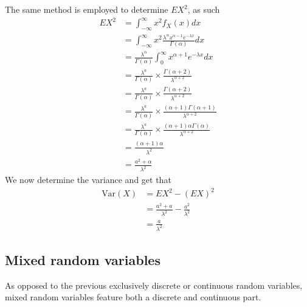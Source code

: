 The same method is employed to determine $EX^{2}$, as such
\begin{align*}
    EX^{2}&=\int_{-\infty}^{\infty}x^{2}f_{X}(x)dx \\
      &=\int_{-\infty}^{\infty}x^{2}\frac{\lambda^{\alpha}x^{\alpha-1}e^{-\lambda x}}{\Gamma(\alpha)}dx \\
      &=\frac{\lambda^{\alpha}}{\Gamma(\alpha)}\int_{0}^{\infty}x^{\alpha+1}e^{-\lambda x}dx \\
      &=\frac{\lambda^{a}}{\Gamma(\alpha)}\times\frac{\Gamma(\alpha+2)}{\lambda^{\alpha+2}} \\
      &=\frac{\lambda^{a}}{\Gamma(\alpha)}\times\frac{\Gamma(\alpha+2)}{\lambda^{\alpha+2}} \\
      &=\frac{\lambda^{a}}{\Gamma(\alpha)}\times\frac{(\alpha+1)\Gamma(\alpha+1)}{\lambda^{\alpha+2}} \\
      &=\frac{\lambda^{a}}{\Gamma(\alpha)}\times\frac{(\alpha+1)\alpha\Gamma(\alpha)}{\lambda^{\alpha+2}} \\
      &=\frac{(\alpha+1)\alpha}{\lambda^{2}} \\
      &=\frac{a^{2}+\alpha}{\lambda^{2}}
\end{align*}
We now determine the variance and get that
\begin{align*}
    \text{Var}(X)&=EX^{2}-(EX)^{2} \\
             &=\frac{a^{2}+a}{\lambda^{2}}-\frac{a^{2}}{\lambda^{2}} \\
             &=\frac{a}{\lambda^{2}}
\end{align*}
\subsection{Mixed random variables}
As opposed to the previous exclusively discrete or continuous random variables, mixed random variables feature both a discrete and continuous part.
